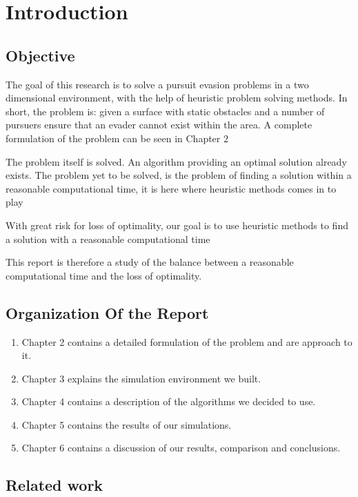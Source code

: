 \chapter{Introduction}
 
\section{Objective}
 
The goal of this research is to solve a pursuit evasion problems in a two dimensional environment, with the help of heuristic problem solving methods.
In short, the problem is: given a surface with static obstacles and a number of pursuers ensure that an evader cannot exist within the area. A complete formulation of the problem can be seen in Chapter 2
 
The problem itself is solved. An algorithm providing an optimal solution already exists.
The problem yet to be solved, is the problem of finding a solution within a reasonable computational time, it is here where heuristic methods comes in to play
 
With great risk for loss of optimality, our goal is to use heuristic methods to find a solution with a reasonable computational time
 
This report is therefore a study of the balance between a reasonable computational time and the loss of optimality.
 
\section{Organization Of the Report}
\begin{enumerate}
\item Chapter 2 contains a detailed formulation of the problem and are approach to it.
\item Chapter 3 explains the simulation environment we built.
\item Chapter 4 contains a description of the algorithms we decided to use.
\item Chapter 5 contains the results of our simulations.
\item Chapter 6 contains a discussion of our results, comparison and conclusions.
\end{enumerate}
 
\section{ Related work}
 
